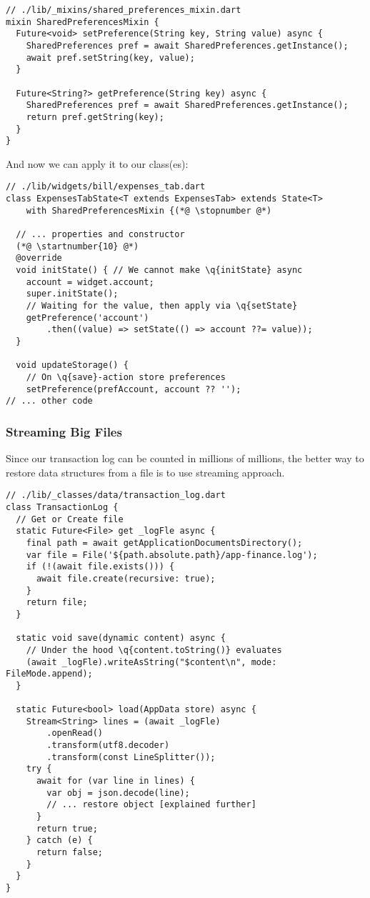 \begin{lstlisting}
// ./lib/_mixins/shared_preferences_mixin.dart
mixin SharedPreferencesMixin {
  Future<void> setPreference(String key, String value) async {
    SharedPreferences pref = await SharedPreferences.getInstance();
    await pref.setString(key, value);
  }

  Future<String?> getPreference(String key) async {
    SharedPreferences pref = await SharedPreferences.getInstance();
    return pref.getString(key);
  }
}
\end{lstlisting}

\noindent And now we can apply it to our class(es):

\begin{lstlisting}
// ./lib/widgets/bill/expenses_tab.dart
class ExpensesTabState<T extends ExpensesTab> extends State<T>
    with SharedPreferencesMixin {(*@ \stopnumber @*)

  // ... properties and constructor
  (*@ \startnumber{10} @*)
  @override
  void initState() { // We cannot make \q{initState} async
    account = widget.account;
    super.initState();
    // Waiting for the value, then apply via \q{setState}
    getPreference('account')
        .then((value) => setState(() => account ??= value));
  }

  void updateStorage() {
    // On \q{save}-action store preferences
    setPreference(prefAccount, account ?? '');
// ... other code
\end{lstlisting}


\subsubsection{Streaming Big Files}

Since our transaction log can be counted in millions of millions, the better way to restore data structures from a file
is to use streaming approach.

\begin{lstlisting}
// ./lib/_classes/data/transaction_log.dart
class TransactionLog {
  // Get or Create file
  static Future<File> get _logFle async {
    final path = await getApplicationDocumentsDirectory();
    var file = File('${path.absolute.path}/app-finance.log');
    if (!(await file.exists())) {
      await file.create(recursive: true);
    }
    return file;
  }

  static void save(dynamic content) async {
    // Under the hood \q{content.toString()} evaluates
    (await _logFle).writeAsString("$content\n", mode: FileMode.append);
  }

  static Future<bool> load(AppData store) async {
    Stream<String> lines = (await _logFle)
        .openRead()
        .transform(utf8.decoder)
        .transform(const LineSplitter());
    try {
      await for (var line in lines) {
        var obj = json.decode(line);
        // ... restore object [explained further]
      }
      return true;
    } catch (e) {
      return false;
    }
  }
}
\end{lstlisting}

